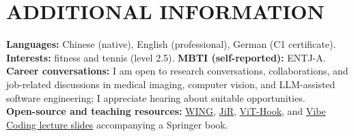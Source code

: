 \documentclass[10pt,a4paper]{article}
\begin{document}
\section{ADDITIONAL INFORMATION}
\textbf{Languages:} Chinese (native), English (professional), German (C1 certificate).\\
\textbf{Interests:} fitness and tennis (level 2.5). \quad \textbf{MBTI (self-reported):} ENTJ-A.\\
\textbf{Career conversations:} I am open to research conversations, collaborations, and job-related discussions in medical imaging, computer vision, and LLM-assisted software engineering; I appreciate hearing about suitable opportunities.\\
\textbf{Open-source and teaching resources:} \href{https://github.com/siyuan-mei/WING}{WING}, \href{https://github.com/siyuan-mei/JiR}{JiR}, \href{https://github.com/siyuan-mei/ViT-Hook}{ViT-Hook}, and \href{https://github.com/PRLab-FAU/VibeCodingSlides}{Vibe Coding lecture slides} accompanying a Springer book.
\end{document}
